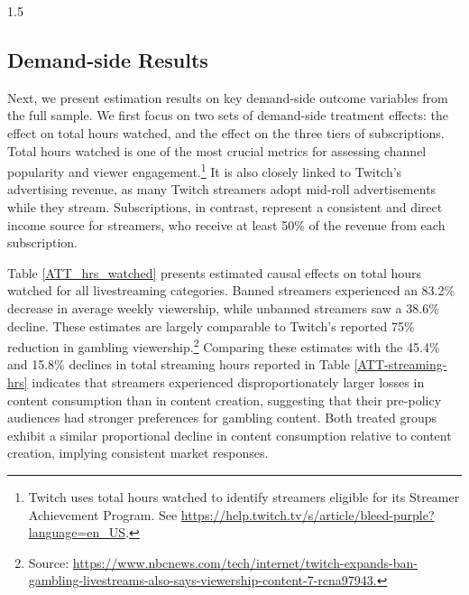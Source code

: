 \documentclass[a4paper,12pt]{article}
\begin{document}
\begin{spacing}{1.5}
\subsection{Demand-side Results}\label{section-demand-side-results}

Next, we present estimation results on key demand-side outcome variables from the full sample. We first focus on two sets of demand-side treatment effects: the effect on total hours watched, and the effect on the three tiers of subscriptions. Total hours watched is one of the most crucial metrics for assessing channel popularity and viewer engagement.\footnote{Twitch uses total hours watched to identify streamers eligible for its Streamer Achievement Program. See \url{https://help.twitch.tv/s/article/bleed-purple?language=en\_US}.} It is also closely linked to Twitch’s advertising revenue, as many Twitch streamers adopt mid-roll advertisements while they stream. Subscriptions, in contrast, represent a consistent and direct income source for streamers, who receive at least 50\% of the revenue from each subscription.

Table \ref{ATT_hrs_watched} presents estimated causal effects on total hours watched for all livestreaming categories. Banned streamers experienced an 83.2\% decrease in average weekly viewership, while unbanned streamers saw a 38.6\% decline. These estimates are largely comparable to Twitch's reported 75\% reduction in gambling viewership.\footnote{Source: \url{https://www.nbcnews.com/tech/internet/twitch-expands-ban-gambling-livestreams-also-says-viewership-content-7-rcna97943.}} Comparing these estimates with the 45.4\% and 15.8\% declines in total streaming hours reported in Table \ref{ATT-streaming-hrs} indicates that streamers experienced disproportionately larger losses in content consumption than in content creation, suggesting that their pre-policy audiences had stronger preferences for gambling content. Both treated groups exhibit a similar proportional decline in content consumption relative to content creation, implying consistent market responses.


\end{spacing}
\end{document}
